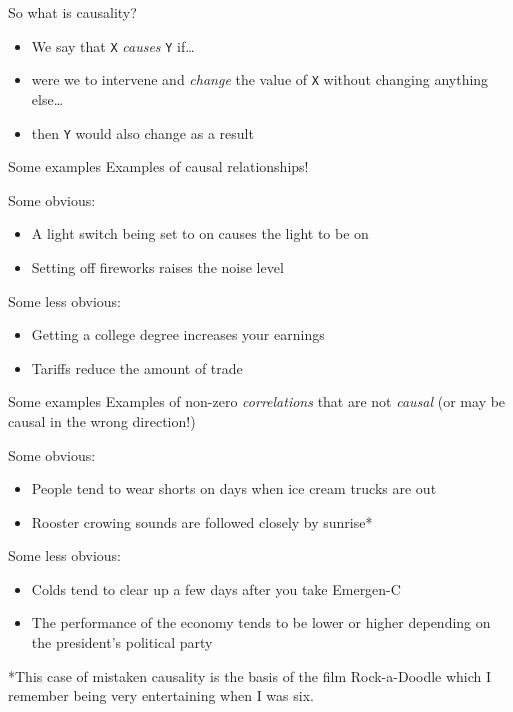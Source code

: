 \documentclass[
  ignorenonframetext,
]{beamer}
\providecommand{\tightlist}{%
  \setlength{\itemsep}{0pt}\setlength{\parskip}{0pt}}
\begin{document}
\begin{frame}[fragile]{So what is causality?}
\label{so-what-is-causality}
\begin{itemize}
\tightlist
\item
  We say that \texttt{X} \emph{causes} \texttt{Y} if\ldots{}
\item
  were we to intervene and \emph{change} the value of \texttt{X} without
  changing anything else\ldots{}
\item
  then \texttt{Y} would also change as a result
\end{itemize}
\end{frame}

\begin{frame}{Some examples}
\label{some-examples}
Examples of causal relationships!

Some obvious:

\begin{itemize}
\tightlist
\item
  A light switch being set to on causes the light to be on
\item
  Setting off fireworks raises the noise level
\end{itemize}

Some less obvious:

\begin{itemize}
\tightlist
\item
  Getting a college degree increases your earnings
\item
  Tariffs reduce the amount of trade
\end{itemize}
\end{frame}

\begin{frame}{Some examples}
\label{some-examples-1}
Examples of non-zero \emph{correlations} that are not \emph{causal} (or
may be causal in the wrong direction!)

Some obvious:

\begin{itemize}
\tightlist
\item
  People tend to wear shorts on days when ice cream trucks are out
\item
  Rooster crowing sounds are followed closely by sunrise*
\end{itemize}

Some less obvious:

\begin{itemize}
\tightlist
\item
  Colds tend to clear up a few days after you take Emergen-C
\item
  The performance of the economy tends to be lower or higher depending
  on the president's political party
\end{itemize}

*This case of mistaken causality is the basis of the film Rock-a-Doodle
which I remember being very entertaining when I was six.
\end{frame}
\end{document}

